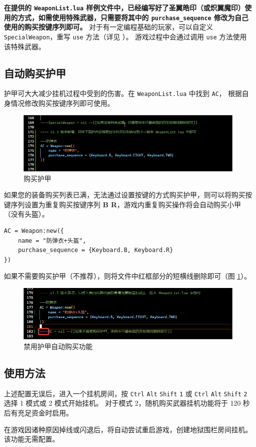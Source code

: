 \textbf{\color{red} 在提供的 \lstinline{WeaponList.lua} 样例文件中，已经编写好了圣翼皓印（或炽翼魔印）使用的方式，如需使用特殊武器，只需要将其中的 \lstinline{purchase_sequence} 修改为自己使用的购买按键序列即可。}
对于有一定编程基础的玩家，可以自定义 \lstinline{SpecialWeapon}，重写 \lstinline{use} 方法（详见 ）。
游戏过程中会通过调用 \lstinline{use} 方法使用该特殊武器。

\subsection{自动购买护甲}

护甲可大大减少挂机过程中受到的伤害。在 \lstinline{WeaponList.lua} 中找到 \lstinline{AC}， 根据自身情况修改购买按键序列即可使用。

\begin{figure}
    \Centering
    \includegraphics[width=\textwidth]{docs/assets/buy_ac.png}
    \caption{购买护甲}
\end{figure}

如果您的装备购买列表已满，无法通过设置按键的方式购买护甲，则可以将购买按键序列设置为重复购买按键序列 \textbf{\color{red}B R}，游戏内重复购买操作将会自动购买小甲（没有头盔）。

\begin{verbatim}
AC = Weapon:new({
    name = "防弹衣+头盔",
    purchase_sequence = {Keyboard.B, Keyboard.R}
})
\end{verbatim}

如果不需要购买护甲（不推荐），则将文件中红框部分的短横线删除即可（图 \ref{ch2fig-delete-ac}）。

\begin{figure}
    \Centering
    \includegraphics[width=\textwidth]{docs/assets/delete_AC.png}
    \caption{禁用护甲自动购买功能}
    \label{ch2fig-delete-ac}
\end{figure}

\subsection{使用方法}

上述配置无误后，进入一个挂机房间，按 \lstinline{Ctrl} \lstinline{Alt} \lstinline{Shift} \lstinline{1} 或 \lstinline{Ctrl} \lstinline{Alt} \lstinline{Shift} \lstinline{2} 选择 1 模式或 2 模式开始挂机。
对于模式 2，随机购买武器挂机功能将于 120 秒后有充足资金时启用。

在游戏因诸种原因掉线或闪退后，将自动尝试重启游戏，创建地狱围栏房间挂机。该功能无需配置。